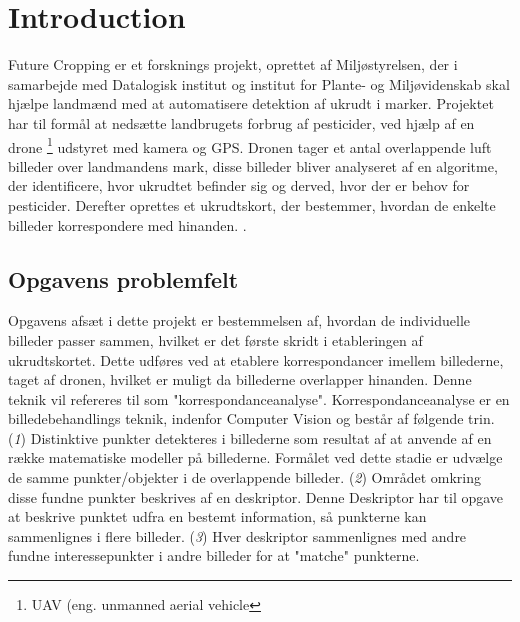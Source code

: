 \chapter{Introduction} \label{sec:intro}
Future Cropping er et forsknings projekt, oprettet af Miljøstyrelsen, der i samarbejde med Datalogisk institut og institut for Plante- og Miljøvidenskab skal hjælpe landmænd med at automatisere detektion af ukrudt i marker. Projektet har til formål at nedsætte landbrugets forbrug af pesticider, ved hjælp af en drone \footnote{UAV (eng. unmanned aerial vehicle} udstyret med kamera og GPS. Dronen tager et antal overlappende luft billeder over landmandens mark, disse billeder bliver analyseret af en algoritme, der identificere, hvor ukrudtet befinder sig og derved, hvor der er behov for pesticider. Derefter oprettes et ukrudtskort, der bestemmer, hvordan de enkelte billeder korrespondere med hinanden. \cite{drone}.
\section{Opgavens problemfelt} \label{subsec:felt}
Opgavens afsæt i dette projekt er bestemmelsen af, hvordan de individuelle billeder passer sammen, hvilket er det første skridt i etableringen af ukrudtskortet. Dette udføres ved at etablere korrespondancer imellem billederne, taget af dronen, hvilket er muligt da billederne overlapper hinanden. Denne teknik vil refereres til som "korrespondanceanalyse". Korrespondanceanalyse er en billedebehandlings teknik, indenfor Computer Vision og består af følgende trin. (\textit{1}) Distinktive punkter detekteres i billederne som resultat af at anvende af en række matematiske modeller på billederne. Formålet ved dette stadie er udvælge de samme punkter/objekter i de overlappende billeder. (\textit{2}) Området omkring disse fundne punkter beskrives af en deskriptor. Denne Deskriptor har til opgave at beskrive punktet udfra en bestemt information, så punkterne kan sammenlignes i flere billeder. (\textit{3}) Hver deskriptor sammenlignes med andre fundne interessepunkter i andre billeder for at "matche" punkterne.
